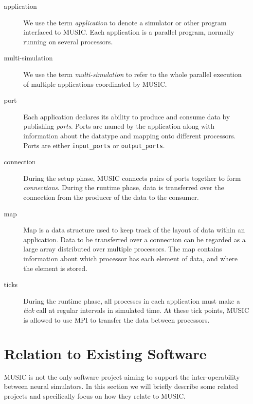 \documentclass[a4paper]{report}
\begin{document}
\begin{description}
\item[application] We use the term
  \emph{application} to denote a simulator or other
  program interfaced to MUSIC.  Each application is a parallel
  program, normally running on several processors.

\item[multi-simulation] We use the term
  \emph{multi-simulation} to refer to the
  whole parallel execution of multiple applications coordinated by
  MUSIC.

\item[port] Each application declares its ability to produce and
  consume data by publishing \emph{ports}.  Ports are
  named by the application along with information about the datatype
  and mapping onto different processors.  Ports are either
  \verb|input_ports| or
  \verb|output_ports|.

\item[connection] During the setup phase, MUSIC connects pairs of
  ports together to form \emph{connections}.  During
  the runtime phase, data is transferred over the connection from the
  producer of the data to the consumer.

\item[map] Map is a data structure used to keep track of
  the layout of data within an application.  Data to be transferred
  over a connection can be regarded as a large array distributed over
  multiple processors.  The map contains information about which
  processor has each element of data, and where the element is stored.

\item[ticks] During the runtime phase, all processes in each
  application must make a \emph{tick} call at regular
  intervals in simulated time.  At these tick points, MUSIC is allowed
  to use MPI to transfer the data between processors.
\end{description}


\section{Relation to Existing Software}

MUSIC is not the only software project aiming to support the
inter-operability between neural simulators.  In this section we will
briefly describe some related projects and specifically focus on how
they relate to MUSIC.
\end{document}
